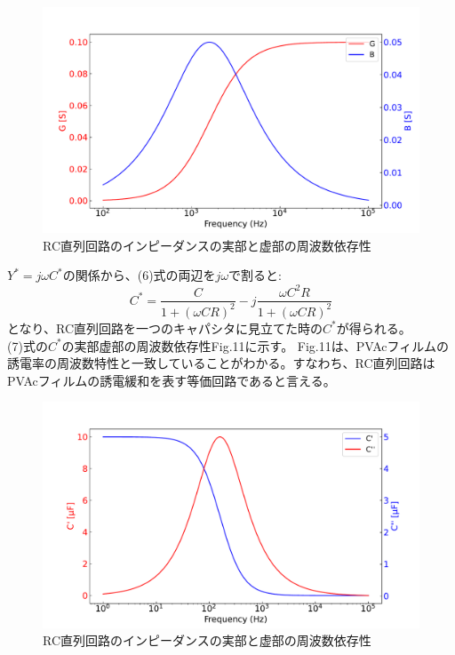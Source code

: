 \documentclass[a4paper,10pt]{jsarticle}
\begin{document}
\begin{multicols}{2}
\begin{figure}[H]
  \centering
  \includegraphics[width=1.1\linewidth]{fig/rc_admittance.pdf}
  \caption{RC直列回路のインピーダンスの実部と虚部の周波数依存性}
  \label{fig:combined_graph}
\end{figure}
$Y^*=j\omega C^*$の関係から、(6)式の両辺を$j\omega$で割ると:
\begin{equation}
  C^* = \frac{C}{1 + (\omega CR)^2} - j\frac{\omega C^2R}{1 + (\omega CR)^2}
\end{equation}
となり、RC直列回路を一つのキャパシタに見立てた時の$C^*$が得られる。\\
(7)式の$C^*$の実部虚部の周波数依存性Fig.11に示す。
Fig.11は、PVAcフィルムの誘電率の周波数特性と一致していることがわかる。すなわち、RC直列回路はPVAcフィルムの誘電緩和を表す等価回路であると言える。

\begin{figure}[H]
  \centering
  \includegraphics[width=1.1\linewidth]{fig/rc_capacita.pdf}
  \caption{RC直列回路のインピーダンスの実部と虚部の周波数依存性}
  \label{fig:combined_graph}
\end{figure}


\end{multicols}
\end{document}
